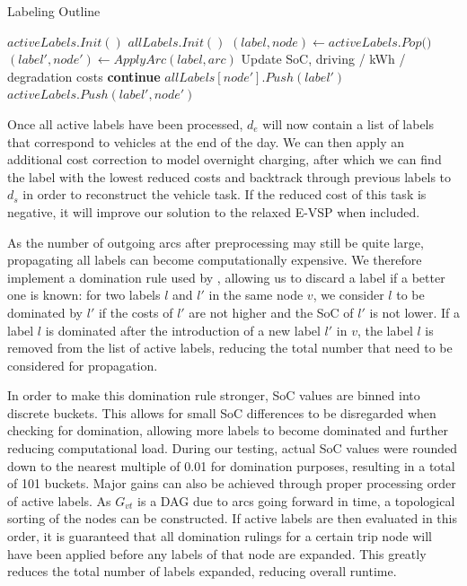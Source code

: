 \documentclass[]{article}
\begin{document}
\begin{algorithm}
\caption{Labeling Outline}\label{alg:evsp-labeling}
\begin{algorithmic}
\State $activeLabels.Init()$ 
\State $allLabels.Init()$ 
    \State $(label, node) \gets \textit{activeLabels.Pop()}$
        \State $(label', node') \gets ApplyArc(label, arc)$ \Comment Update SoC, driving / kWh / degradation costs
          \textbf{continue}
        \EndIf
        \State $allLabels[node'].Push(label')$
          \State $activeLabels.Push(label', node')$
        \EndIf
    \EndFor
\EndWhile
\end{algorithmic}
\end{algorithm}
Once all active labels have been processed, $d_e$ will now contain a list of labels that correspond to vehicles at the end of the day. We can then apply an additional cost correction to model overnight charging, after which we can find the label with the lowest reduced costs and backtrack through previous labels to $d_s$ in order to reconstruct the vehicle task. If the reduced cost of this task is negative, it will improve our solution to the relaxed E-VSP when included. 

As the number of outgoing arcs after preprocessing may still be quite large, propagating all labels can become computationally expensive. We therefore implement a domination rule used by \citet{Huang2016}, allowing us to discard a label if a better one is known: for two labels $l$ and $l'$ in the same node $v$, we consider $l$ to be dominated by $l'$ if the costs of $l'$ are not higher and the SoC of $l'$ is not lower. If a label $l$ is dominated after the introduction of a new label $l'$ in $v$, the label $l$ is removed from the list of active labels, reducing the total number that need to be considered for propagation.

In order to make this domination rule stronger, SoC values are binned into discrete buckets. This allows for small SoC differences to be disregarded when checking for domination, allowing more labels to become dominated and further reducing computational load. During our testing, actual SoC values were rounded down to the nearest multiple of 0.01 for domination purposes, resulting in a total of 101 buckets. Major gains can also be achieved through proper processing order of active labels. As $G_{vt}$ is a DAG due to arcs going forward in time, a topological sorting of the nodes can be constructed. If active labels are then evaluated in this order, it is guaranteed that all domination rulings for a certain trip node will have been applied before any labels of that node are expanded. This greatly reduces the total number of labels expanded, reducing overall runtime.
\end{document}
